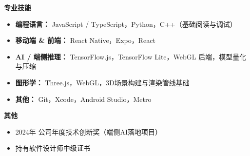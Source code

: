 \documentclass[11pt]{article}
\newcommand{\sectionheader}[1]{%
    \vspace{10pt}%
    \noindent\textcolor{sectionColor}{\textbf{\Large #1}}%
    \vspace{2pt}%
    \hrulefill
    \vspace{6pt}%
}
\begin{document}
\sectionheader{专业技能}
\begin{itemize}
    \item \textcolor{nameColor}{\textbf{编程语言：}} \textcolor{bodyColor}{JavaScript / TypeScript，Python，C++（基础阅读与调试）}
    \item \textcolor{nameColor}{\textbf{移动端 \& 前端：}} \textcolor{bodyColor}{React Native，Expo，React}
    \item \textcolor{nameColor}{\textbf{AI / 端侧推理：}} \textcolor{bodyColor}{TensorFlow.js，TensorFlow Lite，WebGL 后端，模型量化与压缩}
    \item \textcolor{nameColor}{\textbf{图形学：}} \textcolor{bodyColor}{Three.js，WebGL，3D场景构建与渲染管线基础}
    \item \textcolor{nameColor}{\textbf{其他：}} \textcolor{bodyColor}{Git，Xcode，Android Studio，Metro}
\end{itemize}

\sectionheader{其他}
\begin{itemize}
    \item \textcolor{bodyColor}{2024年 公司年度技术创新奖（端侧AI落地项目）}
    \item \textcolor{bodyColor}{持有软件设计师中级证书}
\end{itemize}
\end{document}
